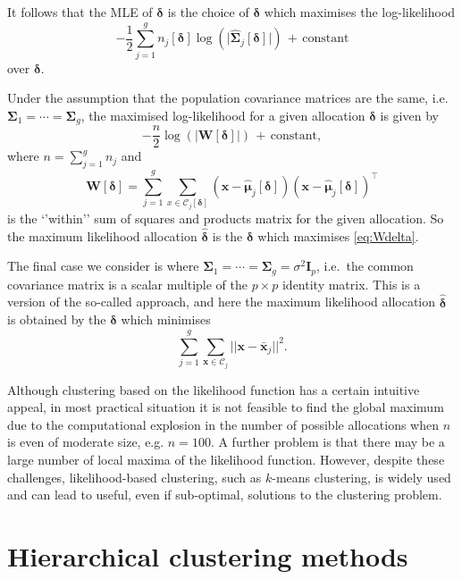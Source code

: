 \documentclass[]{book}
\theoremstyle{definition}
\theoremstyle{definition}
\theoremstyle{definition}
\theoremstyle{remark}
\begin{document}
It follows that the MLE of \(\boldsymbol \delta\) is the choice of \(\boldsymbol \delta\) which maximises the log-likelihood
\[
-\frac{1}{2}\sum_{j=1}^g n_j[\boldsymbol \delta] \log (\vert\hat{\boldsymbol \Sigma}_j[\boldsymbol \delta]\vert)\, + \, \text{constant}
\]
over \(\boldsymbol \delta\).

Under the assumption that the population covariance matrices are the same, i.e. \(\boldsymbol \Sigma_1=\cdots = \boldsymbol \Sigma_g\), the maximised log-likelihood for a given allocation \(\boldsymbol \delta\) is
given by
\begin{equation}
-\frac{n}{2}\log (\vert \boldsymbol W[\boldsymbol \delta]\vert)\, + \,\text{constant},
\label{eq:Wdelta}
\end{equation}
where \(n=\sum_{j=1}^g n_j\) and
\[
\boldsymbol W[\boldsymbol \delta]=\sum_{j=1}^g \sum_{x \in \mathcal{C}_j[{\pmb \delta}]} (\boldsymbol x- \hat{\boldsymbol \mu}_j[\boldsymbol \delta])(\boldsymbol x- \hat{\boldsymbol \mu}_j[\boldsymbol \delta])^\top
\]
is the `'within'' sum of squares and products matrix for the given allocation. So the maximum likelihood allocation \(\hat{\boldsymbol \delta}\) is the \(\boldsymbol \delta\) which maximises \eqref{eq:Wdelta}.

The final case we consider is where \(\boldsymbol \Sigma_1=\cdots = \boldsymbol \Sigma_g=\sigma^2 \boldsymbol I_p\), i.e.~the common covariance matrix is a scalar multiple of the \(p \times p\) identity matrix.
This is a version of the so-called  approach, and here the maximum likelihood allocation \(\hat{\boldsymbol \delta}\) is obtained by the \(\boldsymbol \delta\) which minimises
\[
\sum_{j=1}^g \sum_{\boldsymbol x\in \mathcal{C}_j} \vert \vert \boldsymbol x- \bar{\boldsymbol x}_j\vert \vert^2.
\]

Although clustering based on the likelihood function has a certain intuitive appeal, in most practical situation it is not feasible to find the global maximum due to the
computational explosion in the number of possible allocations when \(n\) is even of moderate size, e.g. \(n=100\). A further problem is that there may be a large number of local maxima of the likelihood function. However, despite these challenges, likelihood-based clustering, such as \(k\)-means clustering, is widely used and can lead to useful, even if sub-optimal, solutions to the clustering problem.

\hypertarget{hierarchical-clustering-methods}{%
\section{Hierarchical clustering methods}\label{hierarchical-clustering-methods}}
\end{document}
